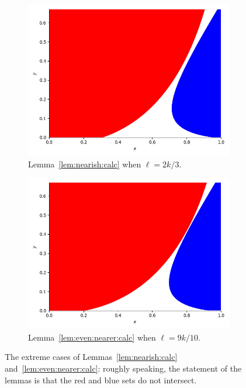 \documentclass[12pt,reqno]{amsart}
\theoremstyle{definition}
\theoremstyle{remark}
\begin{document}
\begin{figure}[ht]
  \centering
  \begin{subfigure}[b]{0.47\textwidth}
    \includegraphics[width=\textwidth]{Figure_offdiag_twofifths.jpeg}
    \caption{Lemma~\ref{lem:nearish:calc} when $\ell = 2k/3$.}
  \end{subfigure}
  \hspace{0.5cm}
  \begin{subfigure}[b]{0.47\textwidth}
    \includegraphics[width=\textwidth]{Figure_offdiag_ninetenths.jpeg}
    \caption{Lemma~\ref{lem:even:nearer:calc} when $\ell = 9k/10$.}
  \end{subfigure}
  \caption{The extreme cases of Lemmas~\ref{lem:nearish:calc} and~\ref{lem:even:nearer:calc}: roughly speaking, the statement of the lemmas is that the red and blue sets do not intersect.}
  \label{fig:offdiagonal}
\end{figure}
\end{document}
